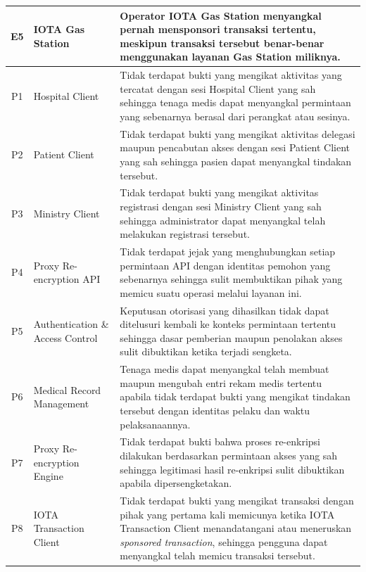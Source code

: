 \begin{xltabular}{\textwidth}{|c|>{\raggedright\arraybackslash}p{3.2cm}|X|}
    E5 &
    IOTA Gas Station &
    Operator IOTA Gas Station menyangkal pernah mensponsori transaksi tertentu, meskipun transaksi tersebut benar-benar menggunakan layanan Gas Station miliknya. \\
    \hline

    P1 &
    Hospital Client &
    Tidak terdapat bukti yang mengikat aktivitas yang tercatat dengan sesi Hospital Client yang sah sehingga tenaga medis dapat menyangkal permintaan yang sebenarnya berasal dari perangkat atau sesinya. \\
    \hline

    P2 &
    Patient Client &
    Tidak terdapat bukti yang mengikat aktivitas delegasi maupun pencabutan akses dengan sesi Patient Client yang sah sehingga pasien dapat menyangkal tindakan tersebut. \\
    \hline

    P3 &
    Ministry Client &
    Tidak terdapat bukti yang mengikat aktivitas registrasi dengan sesi Ministry Client yang sah sehingga administrator dapat menyangkal telah melakukan registrasi tersebut. \\
    \hline

    P4 &
    Proxy Re-encryption API &
    Tidak terdapat jejak yang menghubungkan setiap permintaan API dengan identitas pemohon yang sebenarnya sehingga sulit membuktikan pihak yang memicu suatu operasi melalui layanan ini. \\
    \hline

    P5 &
    Authentication \& Access Control &
    Keputusan otorisasi yang dihasilkan tidak dapat ditelusuri kembali ke konteks permintaan tertentu sehingga dasar pemberian maupun penolakan akses sulit dibuktikan ketika terjadi sengketa. \\
    \hline

    P6 &
    Medical Record Management &
    Tenaga medis dapat menyangkal telah membuat maupun mengubah entri rekam medis tertentu apabila tidak terdapat bukti yang mengikat tindakan tersebut dengan identitas pelaku dan waktu pelaksanaannya. \\
    \hline

    P7 &
    Proxy Re-encryption Engine &
    Tidak terdapat bukti bahwa proses re-enkripsi dilakukan berdasarkan permintaan akses yang sah sehingga legitimasi hasil re-enkripsi sulit dibuktikan apabila dipersengketakan. \\
    \hline

    P8 &
    IOTA Transaction Client &
    Tidak terdapat bukti yang mengikat transaksi dengan pihak yang pertama kali memicunya ketika IOTA Transaction Client menandatangani atau meneruskan \textit{sponsored transaction}, sehingga pengguna dapat menyangkal telah memicu transaksi tersebut. \\
    \hline


\end{xltabular}
